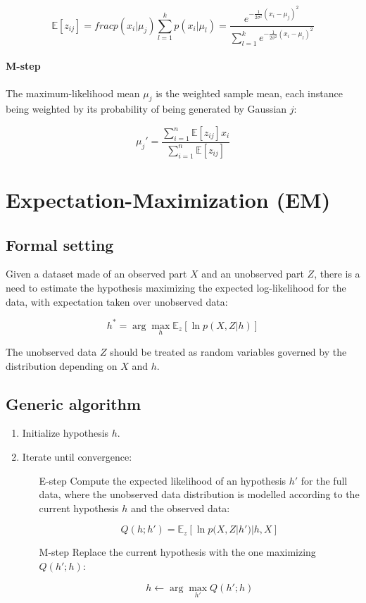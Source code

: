 			$$\mathbb{E}[z_{ij}] = frac{p(x_i|\mu_j)}{\sum\limits_{l=1}^kp(x_i|\mu_l)} = \frac{e^{-\frac{1}{2\sigma^2}(x_i-\mu_j)^2}}{\sum\limits_{l=1}^k e^{-\frac{1}{2\sigma^2}(x_i-\mu_l)^2}}$$

			\paragraph{M-step}
			The maximum-likelihood mean $\mu_j$ is the weighted sample mean, each instance being weighted by its probability of being generated by Gaussian $j$:

			$$\mu_j' = \frac{\sum\limits_{i=1}^n\mathbb{E}[z_{ij}]x_i}{\sum\limits_{i=1}^n\mathbb{E}[z_{ij}]}$$

\section{Expectation-Maximization (EM)}

	\subsection{Formal setting}
	Given a dataset made of an observed part $X$ and an unobserved part $Z$, there is a need to estimate the hypothesis maximizing the expected log-likelihood for the data, with expectation taken over unobserved data:

	$$h^* = \arg\max\limits_{h}\mathbb{E}_z[\ln p(X,Z|h)]$$

	The  unobserved data $Z$ should be treated as random variables governed by the distribution depending on $X$ and $h$.
	
	\subsection{Generic algorithm}

	\begin{enumerate}
		\item Initialize hypothesis $h$.
		\item Iterate until convergence:
			
			\begin{itemize}
				\item[E-step] Compute the expected likelihood of an hypothesis $h'$ for the full data, where the unobserved data distribution is modelled according to the current hypothesis $h$ and the observed data:

					$$Q(h;h') = \mathbb{E}_z[\ln p(X,Z|h')|h,X]$$
					
				\item[M-step] Replace the current hypothesis with the one maximizing $Q(h';h)$:

					$$h\leftarrow\arg\max\limits_{h'}Q(h';h)$$
			\end{itemize}
	\end{enumerate}

